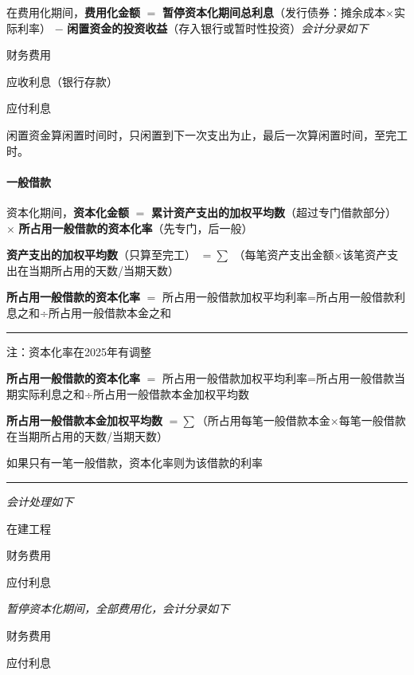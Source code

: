 \documentclass[UTF8,12pt]{ctexart}
\newenvironment{Dr}{%
	\begin{list}{}%
		{
			\setlength{\leftmargin}{2em}
			\setlength{\labelwidth}{2em}
			\setlength{\labelsep}{0pt}
			\setlength{\itemindent}{0pt}
			\setlength{\listparindent}{0pt}
			\setlength{\parsep}{0pt}
			\setlength{\topsep}{0pt}
		}
		\item[\textbf{借：}]
	}{%
	\end{list}
}
\newenvironment{Cr}{%
	\begin{list}{}%
		{
			\setlength{\leftmargin}{3em}
			\setlength{\labelwidth}{2em}
			\setlength{\labelsep}{0pt}
			\setlength{\itemindent}{0pt}
			\setlength{\listparindent}{0pt}
			\setlength{\parsep}{0pt}
			\setlength{\topsep}{0pt}
		}
		\item[\textbf{贷：}]
	}{%
	\end{list}
}
\numberwithin{equation}{section} %
\numberwithin{figure}{section}
\numberwithin{table}{section}
\begin{document}
	在费用化期间，\textbf{费用化金额} $=$ \textbf{暂停资本化期间总利息}（发行债券：摊余成本×实际利率） $-$ \textbf{闲置资金的投资收益}（存入银行或暂时性投资）\textit{会计分录如下}
	
	\begin{Dr}
		财务费用
		
		应收利息（银行存款）
	\end{Dr}
	\begin{Cr}
		应付利息
	\end{Cr}
	
	闲置资金算闲置时间时，只闲置到下一次支出为止，最后一次算闲置时间，至完工时。
	
	\paragraph{一般借款}
	资本化期间，\textbf{资本化金额} $=$ \textbf{累计资产支出的加权平均数}（超过专门借款部分） $\times$ \textbf{所占用一般借款的资本化率}（先专门，后一般）
	
	\textbf{资产支出的加权平均数}（只算至完工） $=\sum$ （每笔资产支出金额×该笔资产支出在当期所占用的天数/当期天数）
	
	\textbf{所占用一般借款的资本化率} $=$ 所占用一般借款加权平均利率=所占用一般借款利息之和÷所占用一般借款本金之和
	
	\vspace{5pt}
	\hrule
	\vspace{5pt}
	注：资本化率在2025年有调整
	
	\textbf{所占用一般借款的资本化率} $=$ 所占用一般借款加权平均利率=所占用一般借款当期实际利息之和÷所占用一般借款本金加权平均数
	
	\textbf{所占用一般借款本金加权平均数} $=\sum$（所占用每笔一般借款本金×每笔一般借款在当期所占用的天数/当期天数）
	
	如果只有一笔一般借款，资本化率则为该借款的利率
	
	\vspace{5pt}
	\hrule
	\vspace{5pt}
	
	\textit{会计处理如下}
	
	\begin{Dr}
		在建工程
		
		财务费用
	\end{Dr}
	\begin{Cr}
		应付利息
	\end{Cr}

	\textit{暂停资本化期间，全部费用化，会计分录如下}
	
	\begin{Dr}
		财务费用
	\end{Dr}
	\begin{Cr}
		应付利息
	\end{Cr}
\end{document}
